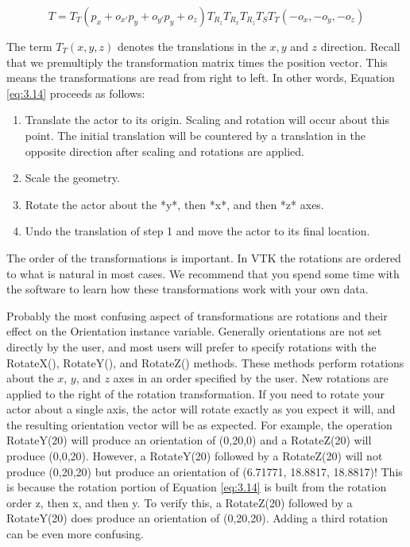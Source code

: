 \begin{equation}\label{eq:3.14}
T = T_T(p_x + o_{x'}p_y + o_{y'}p_y + o_z)T_{R_z}T_{R_x}T_{R_z}T_ST_T(-o_x,-o_y,-o_z)
\end{equation}

The term $T_T(x, y, z)$ denotes the translations in the $x,y$ and $z$ direction. Recall that we premultiply the transformation matrix times the position vector. This means the transformations are read from right to left. In other words, Equation \eqref{eq:3.14} proceeds as follows:

\begin{enumerate}
\item Translate the actor to its origin. Scaling and rotation will occur about this point. The initial translation will be countered by a translation in the opposite direction after scaling and rotations are applied.

\item Scale the geometry.

\item Rotate the actor about the *y*, then *x*, and then *z* axes.

\item Undo the translation of step 1 and move the actor to its final location.
\end{enumerate}

The order of the transformations is important. In VTK the rotations are ordered to what is natural in most cases. We recommend that you spend some time with the software to learn how these transformations work with your own data.

Probably the most confusing aspect of transformations are rotations and their effect on the Orientation instance variable. Generally orientations are not set directly by the user, and most users will prefer to specify rotations with the RotateX(), RotateY(), and RotateZ() methods. These methods perform rotations about the $x$, $y$, and $z$ axes in an order specified by the user. New rotations are applied to the right of the rotation transformation. If you need to rotate your actor about a single axis, the actor will rotate exactly as you expect it will, and the resulting orientation vector will be as expected. For example, the operation RotateY(20) will produce an orientation of (0,20,0) and a RotateZ(20) will produce (0,0,20). However, a RotateY(20) followed by a RotateZ(20) will not produce (0,20,20) but produce an orientation of (6.71771, 18.8817, 18.8817)! This is because the rotation portion of Equation \eqref{eq:3.14} is built from the rotation order z, then x, and then y. To verify this, a RotateZ(20) followed by a RotateY(20) does produce an orientation of (0,20,20). Adding a third rotation can be even more confusing.


